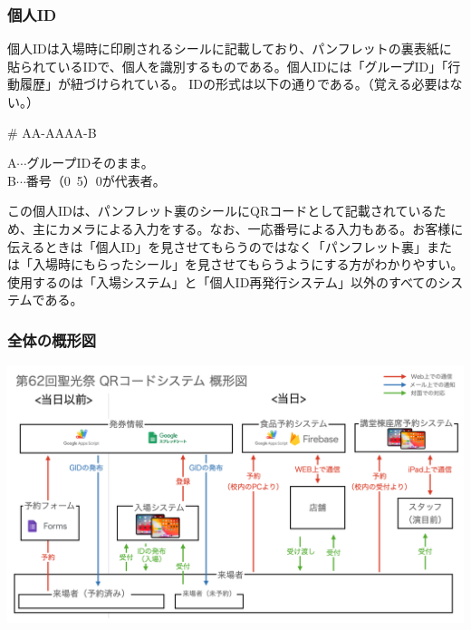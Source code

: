\documentclass[dvipdfmx,jb5]{jarticle}
\begin{document}
 \subsubsection{個人ID}
 個人IDは入場時に印刷されるシールに記載しており、パンフレットの裏表紙に貼られているIDで、個人を識別するものである。個人IDには「グループID」「行動履歴」が紐づけられている。
 IDの形式は以下の通りである。（覚える必要はない。）
 \begin{screen}
 \begin{center}
 {\huge \# AA-AAAA-B}\\
 \end{center}
A$\cdots$グループIDそのまま。\\
B$\cdots$番号（0~5）0が代表者。
\end{screen}
この個人IDは、パンフレット裏のシールにQRコードとして記載されているため、主にカメラによる入力をする。なお、一応番号による入力もある。お客様に伝えるときは「個人ID」を見させてもらうのではなく「パンフレット裏」または「入場時にもらったシール」を見させてもらうようにする方がわかりやすい。使用するのは「入場システム」と「個人ID再発行システム」以外のすべてのシステムである。
\subsubsection{全体の概形図}
 \includegraphics[scale=0.15]{assets/qrcode-system-first-look.png}
\end{document}
